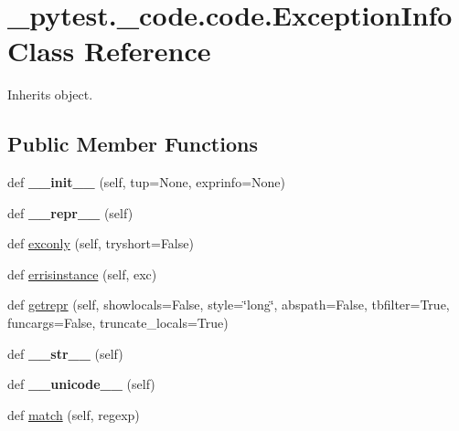 \hypertarget{class__pytest_1_1__code_1_1code_1_1_exception_info}{}\section{\+\_\+pytest.\+\_\+code.\+code.\+Exception\+Info Class Reference}
\label{class__pytest_1_1__code_1_1code_1_1_exception_info}


Inherits object.

\subsection*{Public Member Functions}
\begin{DoxyCompactItemize}
\item 
\mbox{\label{class__pytest_1_1__code_1_1code_1_1_exception_info_af1bec3aff93c302543acc5b4e432874f}} 
def {\bfseries \+\_\+\+\_\+init\+\_\+\+\_\+} (self, tup=None, exprinfo=None)
\item 
\mbox{\label{class__pytest_1_1__code_1_1code_1_1_exception_info_a0ba5a2c5c325c4b33472fa3662dcd51d}} 
def {\bfseries \+\_\+\+\_\+repr\+\_\+\+\_\+} (self)
\item 
def \hyperlink{class__pytest_1_1__code_1_1code_1_1_exception_info_a9d620ab4a39df99eb21c640a6e6677ff}{exconly} (self, tryshort=False)
\item 
def \hyperlink{class__pytest_1_1__code_1_1code_1_1_exception_info_ad860848bfec5f4a146816240745e0ae5}{errisinstance} (self, exc)
\item 
def \hyperlink{class__pytest_1_1__code_1_1code_1_1_exception_info_adb77d6564f59da03dc2a08ba64484cad}{getrepr} (self, showlocals=False, style=\char`\"{}long\char`\"{}, abspath=False, tbfilter=True, funcargs=False, truncate\+\_\+locals=True)
\item 
\mbox{\label{class__pytest_1_1__code_1_1code_1_1_exception_info_a4ceb8d3c2a09aac6bee0af4a66776faa}} 
def {\bfseries \+\_\+\+\_\+str\+\_\+\+\_\+} (self)
\item 
\mbox{\label{class__pytest_1_1__code_1_1code_1_1_exception_info_a16a2518031df1cfa9057c8feff154c2b}} 
def {\bfseries \+\_\+\+\_\+unicode\+\_\+\+\_\+} (self)
\item 
def \hyperlink{class__pytest_1_1__code_1_1code_1_1_exception_info_a4f098c68872a17664de89b00ebac9190}{match} (self, regexp)
\end{DoxyCompactItemize}
